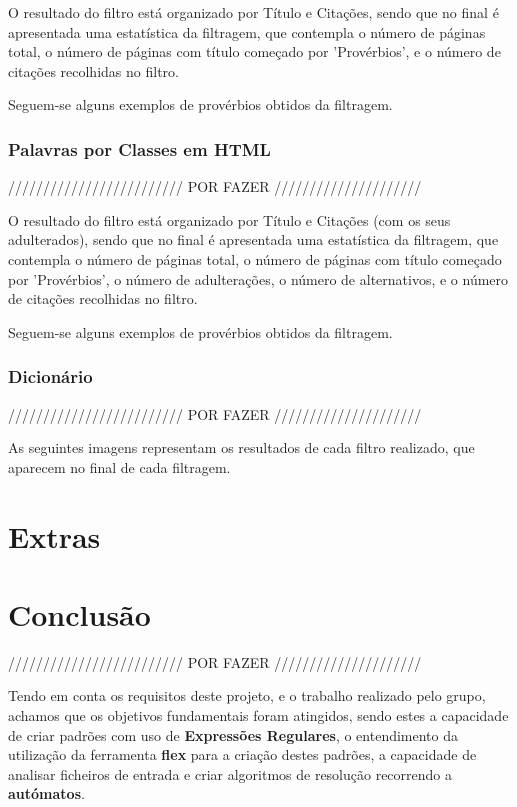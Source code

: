 \documentclass[11pt,a4paper]{report}
\begin{document}
O resultado do filtro está organizado por Título e Citações, sendo que no final é apresentada uma estatística da filtragem, que contempla o número de páginas total, o número de páginas com título começado por 'Provérbios', e o número de citações recolhidas no filtro.

Seguem-se alguns exemplos de provérbios obtidos da filtragem.


\newpage

\subsection{Palavras por Classes em HTML}

///////////////////////// POR FAZER /////////////////////

O resultado do filtro está organizado por Título e Citações (com os seus adulterados), sendo que no final é apresentada uma estatística da filtragem, que contempla o número de páginas total, o número de páginas com título começado por 'Provérbios', o número de adulterações, o número de alternativos, e o número de citações recolhidas no filtro.

Seguem-se alguns exemplos de provérbios obtidos da filtragem.

\newpage

\subsection{Dicionário}


///////////////////////// POR FAZER /////////////////////

As seguintes imagens representam os resultados de cada filtro realizado, que aparecem no final de cada filtragem.



\chapter{Extras}
\label{chap:extras}



\chapter{Conclusão}
\label{chap:concl}

///////////////////////// POR FAZER /////////////////////

Tendo em conta os requisitos deste projeto, e o trabalho realizado pelo grupo, achamos que os objetivos fundamentais foram atingidos, sendo estes a capacidade de criar padrões com uso de \textbf{Expressões Regulares}, o entendimento da utilização da ferramenta \textbf{flex} para a criação destes padrões, a capacidade de analisar ficheiros de entrada e criar algoritmos de resolução recorrendo a \textbf{autómatos}.
\end{document}

